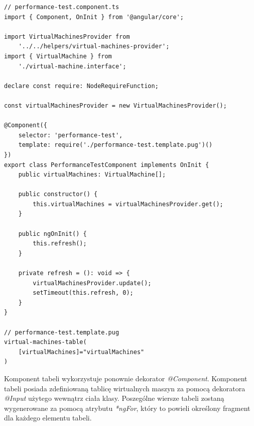 \documentclass[polish, twoside, 12pt]{mwart}
\begin{document}
\begin{lstlisting}[caption=Główny komponent]
// performance-test.component.ts
import { Component, OnInit } from '@angular/core';

import VirtualMachinesProvider from
    '../../helpers/virtual-machines-provider';
import { VirtualMachine } from
    './virtual-machine.interface';

declare const require: NodeRequireFunction;

const virtualMachinesProvider = new VirtualMachinesProvider();

@Component({
    selector: 'performance-test',
    template: require('./performance-test.template.pug')()
})
export class PerformanceTestComponent implements OnInit {
    public virtualMachines: VirtualMachine[];

    public constructor() {
        this.virtualMachines = virtualMachinesProvider.get();
    }

    public ngOnInit() {
        this.refresh();
    }

    private refresh = (): void => {
        virtualMachinesProvider.update();
        setTimeout(this.refresh, 0);
    }
}

// performance-test.template.pug
virtual-machines-table(
    [virtualMachines]="virtualMachines"
)
\end{lstlisting}

Komponent tabeli wykorzystuje ponownie dekorator \emph{@Component}. Komponent tabeli posiada zdefiniowaną tablicę wirtualnych maszyn za pomocą dekoratora \emph{@Input} użytego wewnątrz ciała klasy. Poszególne wiersze tabeli zostaną wygenerowane za pomocą atrybutu \emph{*ngFor}, który to powieli określony fragment dla każdego elementu tabeli.
\end{document}
